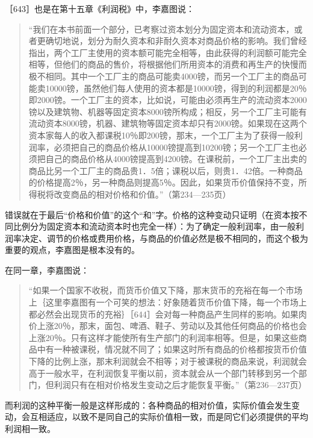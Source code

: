 ［643］也是在第十五章《利润税》中，李嘉图说：

\begin{quote}{“我们在本书前面一个部分，已考察过资本划分为固定资本和流动资本，或者更确切地说，划分为耐久资本和非耐久资本对商品价格的影响。我们曾经指出，两个工厂主使用的资本额可能完全相等，由此获得的利润额可能完全相等，但他们的商品的售价，将根据他们所用资本的消费和再生产的快慢而极不相同。其中一个工厂主的商品可能卖4000镑，而另一个工厂主的商品可能卖10000镑，虽然他们每人使用的资本都是10000镑，得到的利润都是20％即2000镑。一个工厂主的资本，比如说，可能由必须再生产的流动资本2000镑以及建筑物、机器等固定资本8000镑所构成；相反，另一个工厂主可能有流动资本8000镑，机器、建筑物等固定资本却只有2000镑。如果现在这两个资本家每人的收入都课税10％即200镑，那末，一个工厂主为了获得一般利润率，必须把自己的商品价格从10000镑提高到10200镑；另一个工厂主也必须把自己的商品价格从4000镑提高到4200镑。在课税前，一个工厂主出卖的商品比另一个工厂主的商品贵1．5倍；课税以后，则贵1．42倍。一种商品的价格提高2％，另一种商品则提高5％。因此，如果货币价值保持不变，所得税将改变商品的相对价格和价值。”（第234—235页）}\end{quote}

错误就在于最后“价格和价值”的这个“和”字。价格的这种变动只证明（在资本按不同比例分为固定资本和流动资本时也完全一样）：为了确定一般利润率，由一般利润率决定、调节的价格或费用价格，与商品的价值必然是极不相同的，而这个极为重要的观点，李嘉图是根本没有的。

在同一章，李嘉图说：

\begin{quote}{“如果一个国家不收税，而货币价值又下降，那末货币的充裕在每一个市场上｛这里李嘉图有一个可笑的想法：好象随着货币价值下降，每一个市场上都必然会出现货币的充裕｝［644］会对每一种商品产生同样的影响。如果肉价上涨20％，那末，面包、啤酒、鞋子、劳动以及其他任何商品的价格也会上涨20％。只有这样才能使所有生产部门的利润率相等。但是，如果这些商品中有一种被课税，情况就不同了；如果这时所有商品的价格都按货币价值下降的比例上涨，那末利润就会不相等；对于被课税的商品来说，利润就会高于一般水平，在利润恢复平衡以前，资本就会从一个部门转移到另一个部门，但利润只有在相对价格发生变动之后才能恢复平衡。”（第236—237页）}\end{quote}

而利润的这种平衡一般是这样形成的：各种商品的相对价值，实际价值会发生变动，会互相适应，以致不是同自己的实际价值相一致，而是同它们必须提供的平均利润相一致。



